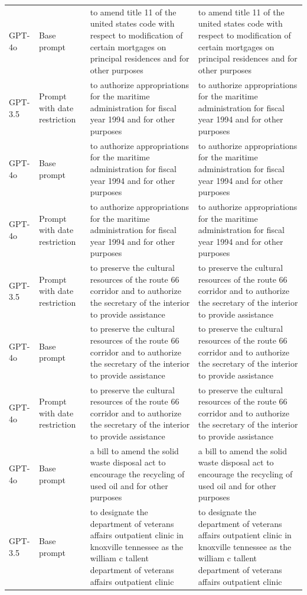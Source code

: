 \begin{longtable}{>{\raggedright\arraybackslash}p{1.4cm}>{\raggedright\arraybackslash}p{1.4cm}>{\raggedright\arraybackslash}p{5.5cm}>{\raggedright\arraybackslash}p{5.5cm}}
GPT-4o & Base prompt & to amend title 11 of the united states code with respect to modification of certain mortgages on principal residences and for other purposes & to amend title 11 of the united states code with respect to modification of certain mortgages on principal residences and for other purposes\\
GPT-3.5 & Prompt with date restriction & to authorize appropriations for the maritime administration for fiscal year 1994 and for other purposes & to authorize appropriations for the maritime administration for fiscal year 1994 and for other purposes\\
GPT-4o & Base prompt & to authorize appropriations for the maritime administration for fiscal year 1994 and for other purposes & to authorize appropriations for the maritime administration for fiscal year 1994 and for other purposes\\
GPT-4o & Prompt with date restriction & to authorize appropriations for the maritime administration for fiscal year 1994 and for other purposes & to authorize appropriations for the maritime administration for fiscal year 1994 and for other purposes\\
GPT-3.5 & Prompt with date restriction & to preserve the cultural resources of the route 66 corridor and to authorize the secretary of the interior to provide assistance & to preserve the cultural resources of the route 66 corridor and to authorize the secretary of the interior to provide assistance\\
GPT-4o & Base prompt & to preserve the cultural resources of the route 66 corridor and to authorize the secretary of the interior to provide assistance & to preserve the cultural resources of the route 66 corridor and to authorize the secretary of the interior to provide assistance\\
GPT-4o & Prompt with date restriction & to preserve the cultural resources of the route 66 corridor and to authorize the secretary of the interior to provide assistance & to preserve the cultural resources of the route 66 corridor and to authorize the secretary of the interior to provide assistance\\
GPT-4o & Base prompt & a bill to amend the solid waste disposal act to encourage the recycling of used oil and for other purposes & a bill to amend the solid waste disposal act to encourage the recycling of used oil and for other purposes\\
GPT-3.5 & Base prompt & to designate the department of veterans affairs outpatient clinic in knoxville tennessee as the william c tallent department of veterans affairs outpatient clinic & to designate the department of veterans affairs outpatient clinic in knoxville tennessee as the william c tallent department of veterans affairs outpatient clinic\\

\end{longtable}
